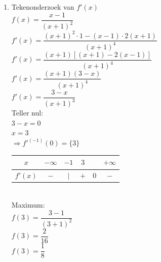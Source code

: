 \documentclass[a4paper]{article}
\begin{document}
\begin{enumerate}
$\Rightarrow f^{(-1)}(0)=\{1\}$\\


\begin{tabular}{c|ccccc}

$x$ & $-\infty$ & $-1$ & $1$ &  & $+\infty$ \\ \hline

$f(x)$ & $-$ & $|$ & $0$ & $+$ & $+$ \\

\end{tabular}\\


\item Tekenonderzoek van $f'(x)$\\

$f(x)=\dfrac{x-1}{(x+1)^2}$\\

$f'(x)=\dfrac{(x+1)^2\cdot 1-(x-1)\cdot 2(x+1)}{(x+1)^4}$\\

$f'(x)=\dfrac{(x+1)[(x+1)-2(x-1)]}{(x+1)^4}$\\

$f'(x)=\dfrac{(x+1)(3-x)}{(x+1)^4}$\\

$f'(x)=\dfrac{3-x}{(x+1)^3}$\\


Teller nul:\\

$3-x=0$\\

$x=3$\\

$\Rightarrow f'^{(-1)}(0)=\{3\}$\\


\begin{tabular}{c|ccccc}

$x$ & $-\infty$ & $-1$ & $3$ &  & $+\infty$ \\ \hline

$f'(x)$ & $-$ & $|$ & $+$ & $0$ & $-$ \\

\end{tabular}\\


Maximum:\\

$f(3)=\dfrac{3-1}{(3+1)^2}$\\

$f(3)=\dfrac{2}{16}$\\

$f(3)=\dfrac{1}{8}$\\


\end{enumerate}
\end{document}
